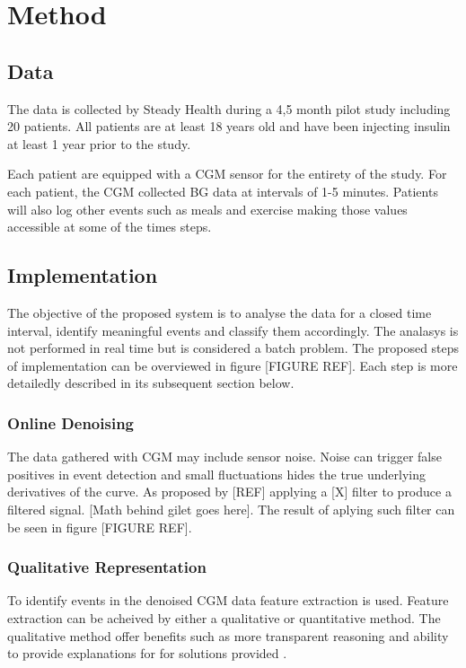 \chapter{Method}

\section{Data}

The data is collected by Steady Health during a 4,5 month pilot study including 20 patients.
All patients are at least 18 years old and have been injecting insulin at least 1 year prior to the study.

Each patient are equipped with a CGM sensor for the entirety of the study.
For each patient, the CGM collected BG data at intervals of 1-5 minutes.
Patients will also log other events such as meals and exercise making those values accessible at some of the times steps.



\section{Implementation}

The objective of the proposed system is to analyse the data for a closed time interval, identify meaningful events and classify them accordingly.
The analasys is not performed in real time but is considered a batch problem.
The proposed steps of implementation can be overviewed in figure [FIGURE REF].
Each step is more detailedly described in its subsequent section below.

\subsection{Online Denoising}

The data gathered with CGM may include sensor noise.
Noise can trigger false positives in event detection and small fluctuations hides the true underlying derivatives of the curve.
As proposed by [REF] applying a [X] filter to produce a filtered signal.
[Math behind gilet goes here].
The result of aplying such filter can be seen in figure [FIGURE REF].

\subsection{Qualitative Representation}

To identify events in the denoised CGM data feature extraction is used.
Feature extraction can be acheived by either a qualitative or quantitative method.
The qualitative method offer benefits such as more transparent reasoning and ability to provide explanations for for solutions provided \parencite{Ven2003}.


